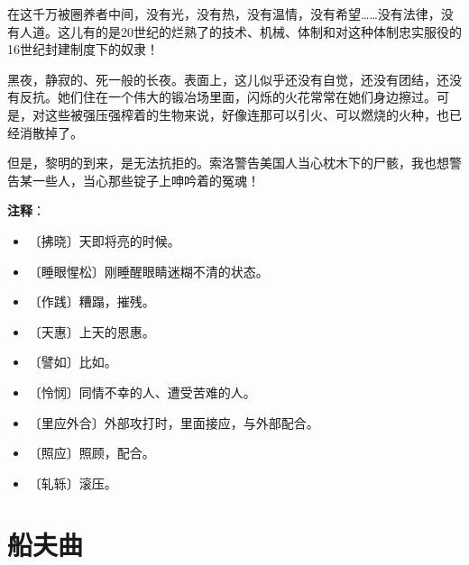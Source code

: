 \documentclass[12pt,UTF-8,openany]{ctexbook}
\begin{document}
\begin{normalsize}
    在这千万被圈养者中间，没有光，没有热，没有温情，没有希望……没有法律，没有人道。这儿有的是20世纪的烂熟了的技术、机械、体制和对这种体制忠实服役的16世纪封建制度下的奴隶！
    
    黑夜，静寂的、死一般的长夜。表面上，这儿似乎还没有自觉，还没有团结，还没有反抗。她们住在一个伟大的锻冶场里面，闪烁的火花常常在她们身边擦过。可是，对这些被强压强榨着的生物来说，好像连那可以引火、可以燃烧的火种，也已经消散掉了。
    
    但是，黎明的到来，是无法抗拒的。索洛警告美国人当心枕木下的尸骸，我也想警告某一些人，当心那些锭子上呻吟着的冤魂！
    
\end{normalsize}


\newpage

\textbf{注释}：

\vspace{-1em}

\begin{itemize}
    \setlength\itemsep{-0.2em}
    \item 〔拂晓〕天即将亮的时候。
    \item 〔睡眼惺松〕刚睡醒眼睛迷糊不清的状态。
    \item 〔作践〕糟蹋，摧残。
    \item 〔天惠〕上天的恩惠。
    \item 〔譬如〕比如。
    \item 〔怜悯〕同情不幸的人、遭受苦难的人。
    \item 〔里应外合〕外部攻打时，里面接应，与外部配合。
    \item 〔照应〕照顾，配合。
    \item 〔轧轹〕滚压。
\end{itemize}

\chapter{船夫曲}
\end{document}
